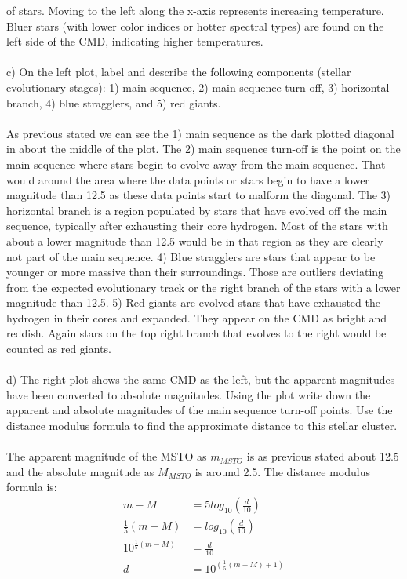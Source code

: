 of stars. Moving to the left along the x-axis represents increasing temperature. Bluer stars (with lower 
color indices or hotter spectral types) are found on the left side of the CMD, indicating higher 
temperatures.\\
\\
c) On the left plot, label and describe the following components (stellar evolutionary stages): 1) main
sequence, 2) main sequence turn-off, 3) horizontal branch, 4) blue stragglers, and 5) red giants.\\
\\
As previous stated we can see the 1) main sequence as the dark plotted diagonal in about the middle of 
the plot. The 2) main sequence turn-off is the point on the main sequence where stars begin to evolve away 
from the main sequence. That would around the area where the data points or stars begin to have a lower 
magnitude than 12.5 as these data points start to malform the diagonal. The 3) horizontal branch is a 
region populated by stars that have evolved off the main sequence, typically after exhausting their core 
hydrogen. Most of the stars with about a lower magnitude than 12.5 would be in that region as they are 
clearly not part of the main sequence. 4) Blue stragglers are stars that appear to be younger or more 
massive than their surroundings. Those are outliers deviating from the expected evolutionary track or the
right branch of the stars with a lower magnitude than 12.5. 5) Red giants are evolved stars that have 
exhausted the hydrogen in their cores and expanded. They appear on the CMD as bright and reddish. Again
stars on the top right branch that evolves to the right would be counted as red giants.\\
\\
d) The right plot shows the same CMD as the left, but the apparent magnitudes have been converted to
absolute magnitudes. Using the plot write down the apparent and absolute magnitudes of the main sequence
turn-off points. Use the distance modulus formula to find the approximate distance to this stellar 
cluster.\\
\\
The apparent magnitude of the MSTO as $m_{MSTO}$ is as previous stated about 12.5 and the absolute 
magnitude as $M_{MSTO}$ is around 2.5. The distance modulus formula is:
\begin{equation*}
  \begin{split}
    m - M &= 5 log_{10}(\frac{d}{10})\\
    \frac{1}{5} (m - M) &= log_{10}(\frac{d}{10})\\
    10^{\frac{1}{5} (m - M)} &= \frac{d}{10}\\
    d &= 10^{(\frac{1}{5} (m - M) + 1)}
  \end{split}
\end{equation*}

